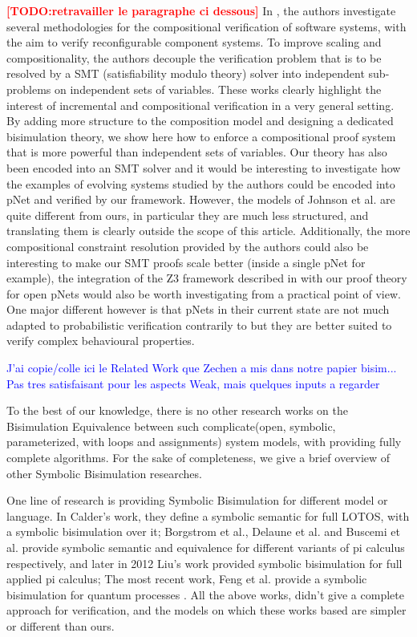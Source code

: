 \documentclass{lmcs}
\newcommand{\TODO}[1]{\textcolor{red}{\textbf{[TODO:#1]}}}
\newcommand{\ERIC}[1]{\textcolor{blue}{#1}}
\begin{document}
\TODO{retravailler le paragraphe ci dessous}
In
\cite{Johnson:2013:CBSE,Johnson:2014:qosa}, the authors investigate several methodologies for the compositional verification of software systems, with the aim to verify reconfigurable component systems. To improve scaling and compositionality, the authors  decouple the verification problem that is to be resolved by a SMT (satisfiability modulo theory) solver into independent sub-problems on independent sets of variables. These works clearly highlight the interest of incremental and compositional verification in a very general setting. By adding more structure to the composition model and designing a dedicated bisimulation theory, we show here how to enforce a compositional proof system that is more powerful than independent sets of variables. Our theory has also been encoded into an SMT solver and it would be interesting to investigate how the examples of evolving systems studied by the authors could be encoded into pNet and verified by our framework. However, the models of Johnson et al. are quite different from ours, in particular they are much less structured, and translating them is clearly outside the scope of this article. Additionally, the more compositional constraint resolution provided by the authors could also be interesting to make our SMT proofs scale better (inside a single pNet for example), the integration of the Z3 framework described in \cite{Johnson:2014:qosa} with our proof theory for open pNets would also be worth investigating from a practical point of view. One major different however is that pNets in their current state are not much adapted to probabilistic verification contrarily to \cite{Johnson:2014:qosa} but they are better suited to verify complex behavioural properties.

\ERIC{J'ai copie/colle ici le Related Work que Zechen a mis dans notre
  papier bisim...
  Pas tres satisfaisant pour les aspects Weak, mais quelques inputs a
  regarder}

To the best of our knowledge, there is no other research works on the Bisimulation Equivalence between such complicate(open, symbolic, parameterized, with loops and assignments) system models, with providing fully complete algorithms.
For the sake of completeness, we give a brief overview of other Symbolic Bisimulation researches.

One line of research is providing Symbolic Bisimulation for different model or language. 
In Calder's work\cite{calder2001symbolic}, they define a symbolic semantic for full LOTOS, with a symbolic bisimulation over it;
Borgstrom et al., Delaune et al. and Buscemi et al. provide symbolic semantic and equivalence for different variants of pi calculus respectively\cite{borgstrom2004symbolic}\cite{delaune2007symbolic}\cite{buscemi2008open}, and later in 2012 Liu's work provided symbolic bisimulation  for full applied pi calculus\cite{liu2010complete};
The most recent work, Feng et al. provide a symbolic bisimulation for quantum processes
\cite{feng2014symbolic}.
All the above works, didn't give a complete approach for verification, and the models on which these works based are simpler or different than ours.
\end{document}
